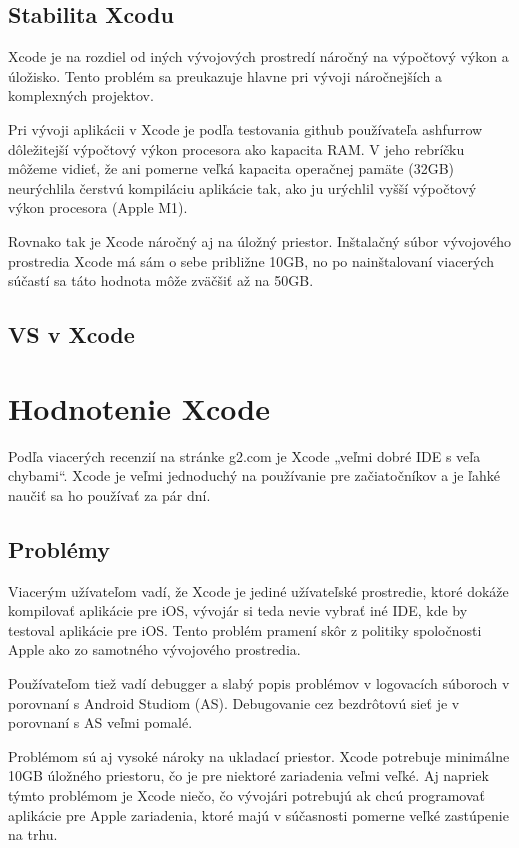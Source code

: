 \documentclass{article}
\begin{document}
\subsection{Stabilita Xcodu}
Xcode je na rozdiel od iných vývojových prostredí náročný na výpočtový výkon a úložisko.  Tento problém sa preukazuje hlavne pri vývoji náročnejších a komplexných projektov.  \par
Pri vývoji aplikácii v Xcode je podľa testovania github používateľa ashfurrow dôležitejší výpočtový výkon procesora ako kapacita RAM.  V jeho rebríčku môžeme vidieť, že ani pomerne veľká kapacita operačnej pamäte (32GB) neurýchlila čerstvú kompiláciu aplikácie tak,  ako ju urýchlil vyšší výpočtový výkon procesora (Apple M1).  \par
Rovnako tak je Xcode náročný aj na úložný priestor.  Inštalačný súbor vývojového prostredia Xcode má sám o sebe približne 10GB,  no po nainštalovaní viacerých súčastí sa táto hodnota môže zväčšiť až na 50GB.

\subsection{VS v Xcode}

\newpage
\section{Hodnotenie Xcode}
Podľa viacerých recenzií na stránke g2.com je Xcode „veľmi dobré IDE s veľa chybami“.  Xcode je veľmi jednoduchý na používanie pre začiatočníkov a je ľahké naučiť sa ho používať za pár dní.

\subsection{Problémy}
Viacerým užívateľom vadí,  že Xcode je jediné užívateľské prostredie,  ktoré dokáže kompilovať aplikácie pre iOS,  vývojár si teda nevie vybrať iné IDE,  kde by testoval aplikácie pre iOS.  Tento problém pramení skôr z politiky spoločnosti Apple ako zo samotného vývojového prostredia.  \par
Používateľom tiež vadí debugger a slabý popis problémov v logovacích súboroch v porovnaní s Android Studiom (AS).  Debugovanie cez bezdrôtovú sieť je v porovnaní s AS veľmi pomalé.  \par
Problémom sú aj vysoké nároky na ukladací priestor.  Xcode potrebuje minimálne 10GB úložného priestoru,  čo je pre niektoré zariadenia veľmi veľké.
Aj napriek týmto problémom je Xcode niečo,  čo vývojári potrebujú ak chcú programovať aplikácie pre Apple zariadenia,  ktoré majú v súčasnosti pomerne veľké zastúpenie na trhu.
\end{document}
